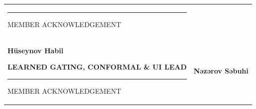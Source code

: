 \documentclass[10pt,a4paper]{article}
\begin{document}
\begin{tabularx}{\textwidth}{
    >{\centering\arraybackslash}X
    >{\centering\arraybackslash}X
}
\begin{minipage}[t]{0.43\textwidth}
{\color{darkgreen}
\rule{0.70\linewidth}{0.7pt}}

\vspace{2pt}

{\scriptsize\color{signaturegray}
MEMBER ACKNOWLEDGEMENT}

\end{minipage}

\\[25pt]


\begin{minipage}[t]{0.43\textwidth}
\centering

{\color{darkgreen}
\setlength{\fboxsep}{8pt}
\setlength{\fboxrule}{0.8pt}
\fbox{
    \begin{minipage}[c][0.8cm][c]{0.8cm}
    \centering
    {\Large\bfseries\azfont HH}
    \end{minipage}
}
}

\vspace{8pt}

{\large\bfseries\azfont Hüseynov Habil}

\vspace{2pt}

{\footnotesize\bfseries\color{darkgreen}
LEARNED GATING, CONFORMAL \& UI LEAD}

\vspace{9pt}

{\color{darkgreen}
\rule{0.70\linewidth}{0.7pt}}

\vspace{2pt}

{\scriptsize\color{signaturegray}
MEMBER ACKNOWLEDGEMENT}

\end{minipage}

&

\begin{minipage}[t]{0.43\textwidth}
\centering

{\color{darkgreen}
\setlength{\fboxsep}{8pt}
\setlength{\fboxrule}{0.8pt}
\fbox{
    \begin{minipage}[c][0.8cm][c]{0.8cm}
    \centering
    {\Large\bfseries\azfont NS}
    \end{minipage}
}
}

\vspace{8pt}

{\large\bfseries\azfont Nəzərov Səbuhi}


\end{minipage}
\end{tabularx}
\end{document}
